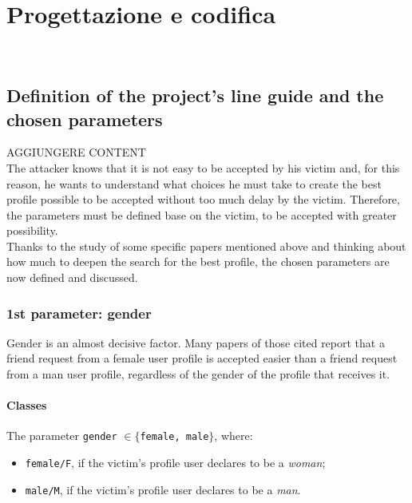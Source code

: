
\chapter{Progettazione e codifica}
\label{cap:progettazione}

\\

\section{Definition of the project's line guide and the chosen parameters}
AGGIUNGERE CONTENT
\\The attacker knows that it is not easy to be accepted by his victim and, for this reason, he wants to understand what choices he must take to create the best profile possible to be accepted without too much delay by the victim. Therefore, the parameters must be defined base on the victim, to be accepted with greater possibility.
\\Thanks to the study of some specific papers mentioned above and thinking about how much to deepen the search for the best profile, the chosen parameters are now defined and discussed.
\subsection{1st parameter: gender}
Gender is an almost decisive factor. Many papers of those cited report that a friend request from a female user profile is accepted easier than a friend request from a man user profile, regardless of the gender of the profile that receives it.
\subsubsection*{Classes}
The parameter \texttt{gender} $ \in \{$\texttt{female, male}$\}$, where: 
\begin{itemize}
	\item \texttt{female/F}, if the victim's profile user declares to be a \textit{woman};
	\item \texttt{male/M}, if the victim's profile user declares to be a \textit{man}.
\end{itemize}
